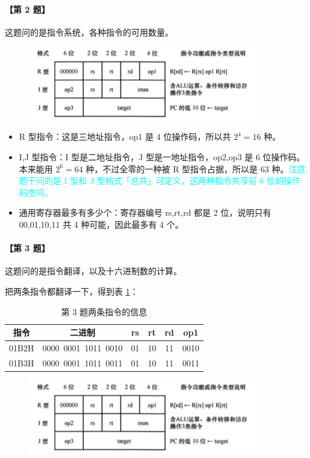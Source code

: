 \documentclass[UTF8]{ctexart}
\begin{document}
\paragraph{【第 2 题】} 这题问的是指令系统，各种指令的可用数量。

\begin{figure}[htb]
    \centering
    \includegraphics[width=10cm]{题目.png}
\end{figure}

\begin{itemize}
    \item R 型指令：这是三地址指令，op1 是 4 位操作码，所以共 $2^4=16$ 种。
    \item I,J 型指令：I 型是二地址指令，J 型是一地址指令，op2,op3 是 6 位操作码。本来能用 $2^6=64$ 种，不过全零的一种被 R 型指令占据，所以是 63 种。\textcolor{cyan}{注意题干问的是 I 型和 J 型格式「总共」可定义，这两种指令共享前 6 位的操作码空间。}
    \item 通用寄存器最多有多少个：寄存器编号 rs,rt,rd 都是 2 位，说明只有 00,01,10,11 共 4 种可能，因此最多有 4 个。
\end{itemize}

\paragraph{【第 3 题】} 这题问的是指令翻译，以及十六进制数的计算。

把两条指令都翻译一下，得到表 \ref{tab:instructions}：

\begin{table}[htb]
    \centering
    \begin{tabular}{cccccc}
    \toprule
    指令 & 二进制 & rs & rt & rd & op1 \\
    \midrule
    01B2H & 0000\ 0001\ 1011\ 0010 & 01 & 10 & 11 & 0010 \\
    01B3H & 0000\ 0001\ 1011\ 0011 & 01 & 10 & 11 & 0011 \\
    \bottomrule
    \end{tabular}
    \caption{第 3 题两条指令的信息}\label{tab:instructions}
\end{table}

\begin{figure}[htb]
    \centering
    \includegraphics[width=10cm]{题目.png}
\end{figure}
\end{document}
